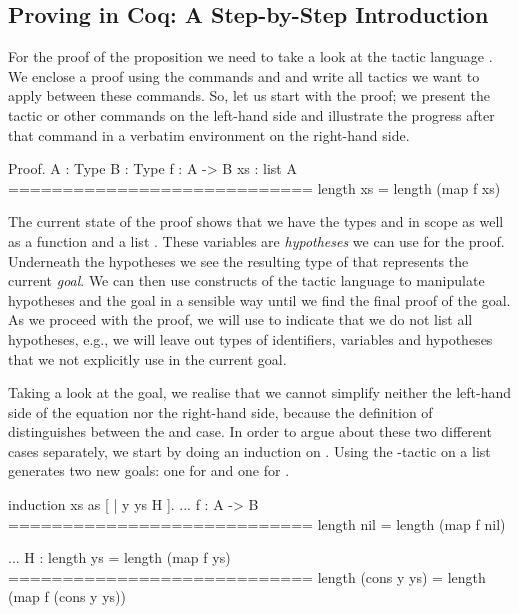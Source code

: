 \subsection{Proving in Coq: A Step\--by\--Step Introduction}
For the proof of the proposition  we need to take a look at the tactic language .
We enclose a proof using the commands  and  and write all tactics we want to apply between these commands.
So, let us start with the proof; we present the tactic or other commands on the left\--hand side and illustrate the progress after that command in a verbatim environment on the right\--hand side.

\begin{cproof}{Proof.}
  A : Type
  B : Type
  f : A -> B
  xs : list A
  ============================
  length xs = length (map f xs)
\end{cproof}

The current state of the proof shows that we have the types  and  in scope as well as a function  and a list .
These variables are \emph{hypotheses} we can use for the proof.
Underneath the hypotheses we see the resulting type of  that represents the current \emph{goal}.
We can then use constructs of the tactic language to manipulate hypotheses and the goal in a sensible way until we find the final proof of the goal.
As we proceed with the proof, we will use  to indicate that we do not list all hypotheses, e.g., we will leave out types of identifiers, variables and hypotheses that we not explicitly use in the current goal.

Taking a look at the goal, we realise that we cannot simplify neither the left\--hand side of the equation nor the right\--hand side, because the definition of  distinguishes between the  and  case.
In order to argue about these two different cases separately, we start by doing an induction on .
Using the \--tactic on a list generates two new goals: one for  and one for .

\begin{cproof}{induction xs as [ | y ys H ].}
  ...
  f : A -> B
  ============================
  length nil = length (map f nil)

  ...
  H : length ys = length (map f ys)
  ============================
  length (cons y ys) =
  length (map f (cons y ys))
\end{cproof}

